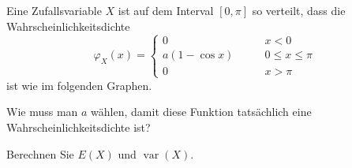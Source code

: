 Eine Zufallsvariable $X$ ist auf dem Interval $[0,\pi]$ so verteilt, dass die
Wahrscheinlichkeitsdichte
\[
\varphi_X(x)=\begin{cases}
0\qquad&x < 0\\
a(1-\cos x)\qquad&0\le x\le\pi\\
0\qquad&x>\pi
\end{cases}
\]
ist wie im folgenden Graphen.
\begin{center}
\end{center}
\begin{teilaufgaben}
\item
Wie muss man $a$ wählen, damit diese Funktion tatsächlich eine
Wahrscheinlichkeitsdichte ist?
\item
Berechnen Sie $E(X)$ und $\operatorname{var}(X)$.
\end{teilaufgaben}


